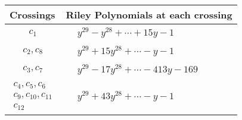 \documentclass[1p]{elsarticle_modified}
\theoremstyle{definition}
\begin{document}
\begin{tabular}{m{50pt}|m{274pt}}
Crossings & \hspace{64pt}Riley Polynomials at each crossing \\
\hline $$\begin{aligned}c_{1}\end{aligned}$$&$\begin{aligned}
&y^{29}- y^{28}+\cdots+15 y-1
\end{aligned}$\\
\hline $$\begin{aligned}c_{2},c_{8}\end{aligned}$$&$\begin{aligned}
&y^{29}+15 y^{28}+\cdots- y-1
\end{aligned}$\\
\hline $$\begin{aligned}c_{3},c_{7}\end{aligned}$$&$\begin{aligned}
&y^{29}-17 y^{28}+\cdots-413 y-169
\end{aligned}$\\
\hline $$\begin{aligned}c_{4},c_{5},c_{6}\\c_{9},c_{10},c_{11}\\c_{12}\end{aligned}$$&$\begin{aligned}
&y^{29}+43 y^{28}+\cdots- y-1
\end{aligned}$\\
\hline
\end{tabular}
\vskip 2pc
\end{document}
